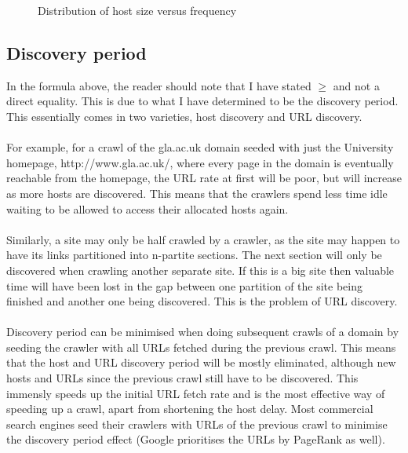 \begin{figure}[h]
  \centerline{
  }
  \caption{Distribution of host size versus frequency}
  \label{fig-hostsizedistribution}
\end{figure}

\subsection{Discovery period}\label{sect-discovery}
In the formula above, the reader should note that I have stated $\geq $ and not a direct equality. This is due to what I have determined to be the discovery period. This essentially comes in two varieties, host discovery and URL discovery.\\
\ \\
For example, for a crawl of the gla.ac.uk domain seeded with just the University homepage, http://www.gla.ac.uk/, where every page in the domain is eventually reachable from the homepage, the URL rate at first will be poor, but will increase as more hosts are discovered. This means that the crawlers spend less time idle waiting to be allowed to access their allocated hosts again.\\
\ \\
Similarly, a site may only be half crawled by a crawler, as the site may happen to have its links partitioned into n-partite sections. The next section will only be discovered when crawling another separate site. If this is a big site then valuable time will have been lost in the gap between one partition of the site being finished and another one being discovered. This is the problem of URL discovery.\\
\ \\
Discovery period can be minimised when doing subsequent crawls of a domain by seeding the crawler with all URLs fetched during the previous crawl. This means that the host and URL discovery period will be mostly eliminated, although new hosts and URLs since the previous crawl still have to be discovered. This immensly speeds up the initial URL fetch rate and is the most effective way of speeding up a crawl, apart from shortening the host delay. Most commercial search engines seed their crawlers with URLs of the previous crawl to minimise the discovery period effect (Google prioritises the URLs by PageRank as well\cite{ref5}).
